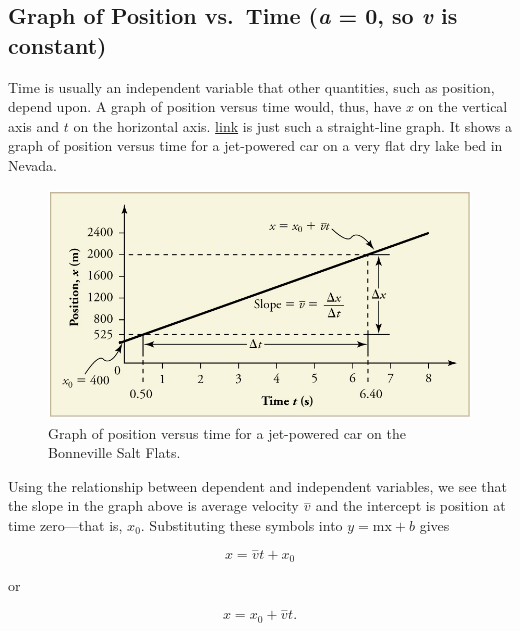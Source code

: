 \documentclass[
]{book}
\begin{document}
\hypertarget{fs-id2201114}{}
\hypertarget{graph-of-position-vs.-time-a-0-so-v-is-constant}{%
\subsection{\texorpdfstring{Graph of Position vs.~Time (\emph{a} = 0, so \emph{v} is constant)}{Graph of Position vs.~Time (a = 0, so v is constant)}}\label{graph-of-position-vs.-time-a-0-so-v-is-constant}}

Time is usually an independent variable that other quantities, such as
position, depend upon. A graph of position versus time would, thus, have
\(x{}\) on the vertical axis and \(t{}\) on the horizontal axis.
\protect\hyperlink{import-auto-id2574769}{link} is just such a
straight-line graph. It shows a graph of position versus time for a
jet-powered car on a very flat dry lake bed in Nevada.

\begin{figure}
\hypertarget{import-auto-id2574769}{%
\centering
\includegraphics{images/Figure_02_07_02.jpg}
\caption{Graph of position versus time for a jet-powered car on the Bonneville
Salt Flats.}\label{import-auto-id2574769}
}
\end{figure}

Using the relationship between dependent and independent variables, we
see that the slope in the graph above is average velocity
\(\overset{-}{v}{}\) and the intercept is position at time zero---that is,
\(x_{0}{}\). Substituting these symbols into \({y = {\text{mx} + b}}{}\)
gives

\leavevmode{}%
\[{{x = \overset{-}{v}}{t + x_{0}}}{}\]

or

\leavevmode{}%
\[{{{x = {x_{0} + \overset{-}{v}}}t}.}{}\]
\end{document}
